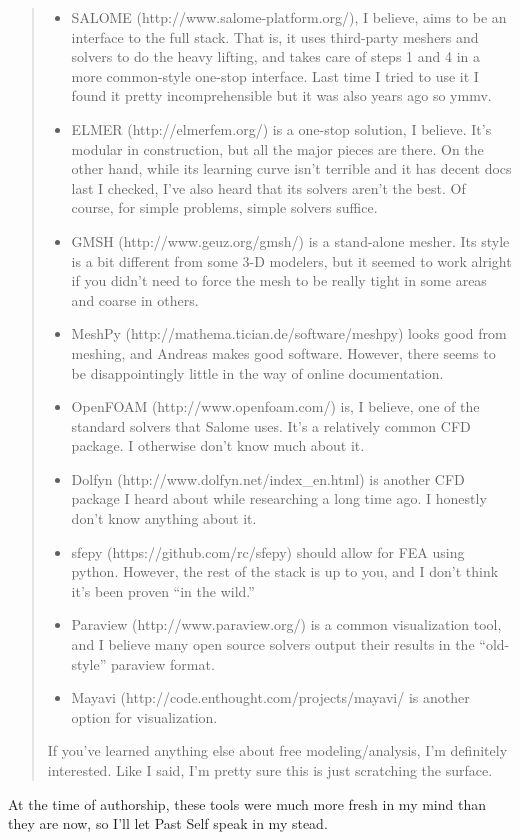 \begin{quote}
\begin{itemize}
\item
  SALOME (http://www.salome-platform.org/), I believe, aims to be
  an interface to the full stack. That is, it uses third-party meshers
  and solvers to do the heavy lifting, and takes care of steps 1 and 4
  in a more common-style one-stop interface. Last time I tried to use it
  I found it pretty incomprehensible but it was also years ago so ymmv.
\item
  ELMER (http://elmerfem.org/) is a one-stop solution, I believe.
  It's modular in construction, but all the major pieces are there. On
  the other hand, while its learning curve isn't terrible and it has
  decent docs last I checked, I've also heard that its solvers aren't
  the best. Of course, for simple problems, simple solvers suffice.
\item
  GMSH (http://www.geuz.org/gmsh/) is a stand-alone mesher. Its
  style is a bit different from some 3-D modelers, but it seemed to work
  alright if you didn't need to force the mesh to be really tight in
  some areas and coarse in others.
\item
  MeshPy (http://mathema.tician.de/software/meshpy) looks good
  from meshing, and Andreas makes good software. However, there seems to
  be disappointingly little in the way of online documentation.
\item
  OpenFOAM (http://www.openfoam.com/) is, I believe, one of the
  standard solvers that Salome uses. It's a relatively common CFD
  package. I otherwise don't know much about it.
\item
  Dolfyn (http://www.dolfyn.net/index\_en.html) is another CFD
  package I heard about while researching a long time ago. I honestly
  don't know anything about it.
\item
  sfepy (https://github.com/rc/sfepy) should allow for FEA using
  python. However, the rest of the stack is up to you, and I don't think
  it's been proven ``in the wild.''
\item
  Paraview (http://www.paraview.org/) is a common visualization
  tool, and I believe many open source solvers output their results in
  the ``old-style'' paraview format.
\item
  Mayavi (http://code.enthought.com/projects/mayavi/ is another
  option for visualization.
\end{itemize}
If you've learned anything else about free modeling/analysis, I'm
definitely interested. Like I said, I'm pretty sure this is just
scratching the surface.

\end{quote}
At the time of authorship, these tools were much more fresh in my mind
than they are now, so I'll let Past Self speak in my stead.

